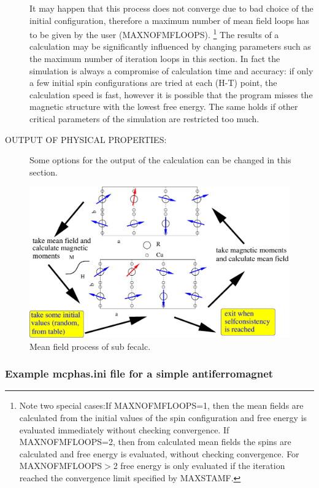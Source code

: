 \begin{description}
It may happen that this process does
not converge due to bad choice of the initial configuration, therefore a maximum number
of mean field loops has to be given by the user (MAXNOFMFLOOPS). \footnote{Note two
special cases:If MAXNOFMFLOOPS=1, then the mean fields are calculated from the initial values
of the spin configuration and free energy is evaluated immediately without checking convergence.
If MAXNOFMFLOOPS=2, then from calculated mean fields the spins are calculated and 
free energy is evaluated, without checking convergence. For  MAXNOFMFLOOPS$>$2 free energy is
only evaluated if the iteration reached the convergence limit specified by MAXSTAMF.}
The results of a calculation may be significantly influenced by
changing parameters such as the maximum number of iteration loops 
in this section. 
In fact the simulation is always a compromise of calculation time and accuracy: if only
a few initial spin configurations are tried at each (H-T) point, the calculation speed is
fast, however it is possible that the program misses the magnetic structure with the
lowest free energy. The same holds if other critical parameters of the simulation are
restricted too much.
 

\item [OUTPUT OF PHYSICAL PROPERTIES:]
Some options for the output of the calculation can be changed in this section.
\end{description}

\begin{figure}[hb]
\includegraphics[angle=0,width=0.9\columnwidth]{figsrc/fecalc.eps}
\caption{\label{fecalc}Mean field process of sub {\prg fecalc}.}
\end{figure}

 
\subsubsection{Example {\prg mcphas.ini} file for a simple antiferromagnet}

